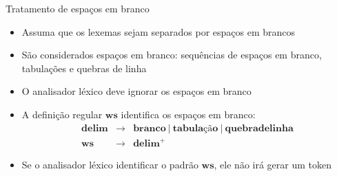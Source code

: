 \begin{frame}[fragile]{Tratamento de espaços em branco}

    \begin{itemize}
        \item Assuma que os lexemas sejam separados por espaços em brancos

        \item São considerados espaços em branco: sequências de espaços em branco, tabulações e quebras de linha

        \item O analisador léxico deve ignorar os espaços em branco

        \item A definição regular $\mathbf{ws}$ identifica os espaços em branco:
        \[
            \begin{array}{rcl}
                \mathbf{delim} & \to & \mathbf{branco}\ |\ \mathbf{tabulação}\ |\ \mathbf{quebra de linha}\\
                \mathbf{ws} & \to & \mathbf{delim}^+
            \end{array}
        \]

        \item Se o analisador léxico identificar o padrão $\mathbf{ws}$, ele não irá gerar um token
    \end{itemize}

\end{frame}

